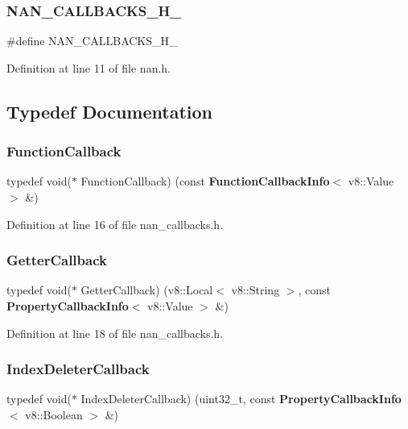 \subsubsection{N\+A\+N\+\_\+\+C\+A\+L\+L\+B\+A\+C\+K\+S\+\_\+\+H\+\_\+}
{\footnotesize\ttfamily \#define N\+A\+N\+\_\+\+C\+A\+L\+L\+B\+A\+C\+K\+S\+\_\+\+H\+\_\+}



Definition at line 11 of file nan.\+h.



\subsection{Typedef Documentation}
\mbox{\label{nan__callbacks_8h_ae2fca5bfeddc3f8b16442f0e1361acb0}} 
\subsubsection{Function\+Callback}
{\footnotesize\ttfamily typedef void($\ast$ Function\+Callback) (const \textbf{ Function\+Callback\+Info}$<$ v8\+::\+Value $>$ \&)}



Definition at line 16 of file nan\+\_\+callbacks.\+h.

\mbox{\label{nan__callbacks_8h_a2907a43d00e1c3044e039f30e755b76b}} 
\subsubsection{Getter\+Callback}
{\footnotesize\ttfamily typedef void($\ast$ Getter\+Callback) (v8\+::\+Local$<$ v8\+::\+String $>$, const \textbf{ Property\+Callback\+Info}$<$ v8\+::\+Value $>$ \&)}



Definition at line 18 of file nan\+\_\+callbacks.\+h.

\mbox{\label{nan__callbacks_8h_ab3cf861ea4ee2776eb426d07a1c72ea5}} 
\subsubsection{Index\+Deleter\+Callback}
{\footnotesize\ttfamily typedef void($\ast$ Index\+Deleter\+Callback) (uint32\+\_\+t, const \textbf{ Property\+Callback\+Info}$<$ v8\+::\+Boolean $>$ \&)}



